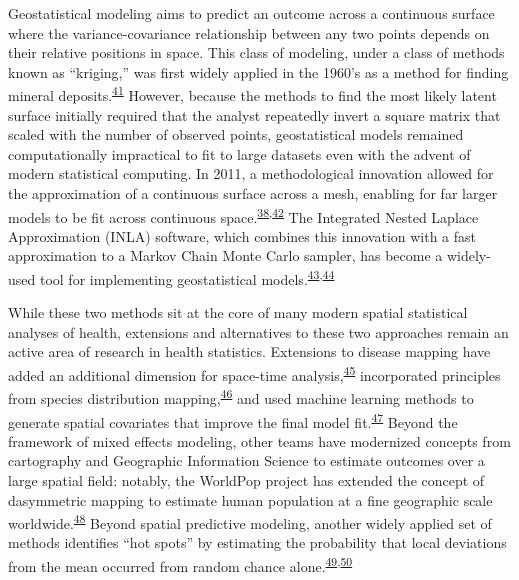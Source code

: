 \documentclass[
]{article}
\begin{document}
Geostatistical modeling aims to predict an outcome across a continuous surface where the variance-covariance relationship between any two points depends on their relative positions in space. This class of modeling, under a class of methods known as ``kriging,'' was first widely applied in the 1960's as a method for finding mineral deposits.\textsuperscript{\protect\hyperlink{ref-Oliver2010}{41}} However, because the methods to find the most likely latent surface initially required that the analyst repeatedly invert a square matrix that scaled with the number of observed points, geostatistical models remained computationally impractical to fit to large datasets even with the advent of modern statistical computing. In 2011, a methodological innovation allowed for the approximation of a continuous surface across a mesh, enabling for far larger models to be fit across continuous space.\textsuperscript{\protect\hyperlink{ref-Lindgren2011}{38},\protect\hyperlink{ref-Miller2020}{42}} The Integrated Nested Laplace Approximation (INLA) software, which combines this innovation with a fast approximation to a Markov Chain Monte Carlo sampler, has become a widely-used tool for implementing geostatistical models.\textsuperscript{\protect\hyperlink{ref-Rue2009}{43},\protect\hyperlink{ref-Krainski2018}{44}}

While these two methods sit at the core of many modern spatial statistical analyses of health, extensions and alternatives to these two approaches remain an active area of research in health statistics. Extensions to disease mapping have added an additional dimension for space-time analysis,\textsuperscript{\protect\hyperlink{ref-Mercer2015}{45}} incorporated principles from species distribution mapping,\textsuperscript{\protect\hyperlink{ref-Hay2013}{46}} and used machine learning methods to generate spatial covariates that improve the final model fit.\textsuperscript{\protect\hyperlink{ref-Bhatt2017}{47}} Beyond the framework of mixed effects modeling, other teams have modernized concepts from cartography and Geographic Information Science to estimate outcomes over a large spatial field: notably, the WorldPop project has extended the concept of dasymmetric mapping to estimate human population at a fine geographic scale worldwide.\textsuperscript{\protect\hyperlink{ref-Tatem2017}{48}} Beyond spatial predictive modeling, another widely applied set of methods identifies ``hot spots'' by estimating the probability that local deviations from the mean occurred from random chance alone.\textsuperscript{\protect\hyperlink{ref-Kulldorff1997}{49},\protect\hyperlink{ref-Banerjee2014}{50}}
\end{document}
